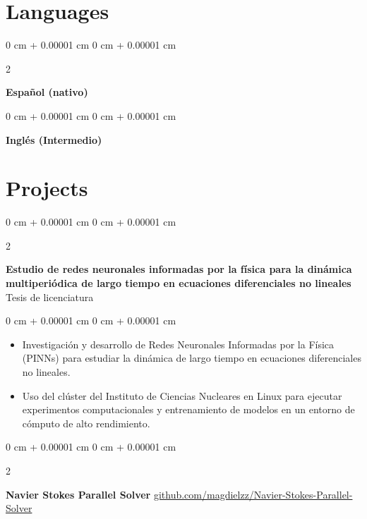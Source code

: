\documentclass[10pt, letterpaper]{article}
\newenvironment{highlights}{
    \begin{itemize}[
        topsep=0.10 cm,
        parsep=0.10 cm,
        partopsep=0pt,
        itemsep=0pt,
        leftmargin=0 cm + 10pt
    ]
}{
    \end{itemize}
} %
\newenvironment{onecolentry}{
    \begin{adjustwidth}{
        0 cm + 0.00001 cm
    }{
        0 cm + 0.00001 cm
    }
}{
    \end{adjustwidth}
} %
\newenvironment{twocolentry}[2][]{
    \onecolentry
    \def\secondColumn{#2}
    \setcolumnwidth{\fill, 4.5 cm}
    \begin{paracol}{2}
}{
    \switchcolumn \raggedleft \secondColumn
    \end{paracol}
    \endonecolentry
} %
\begin{document}
    \section{Languages}
        
        \begin{samepage}
            \begin{twocolentry}{
                
            }
                \textbf{Español (nativo)}
            \end{twocolentry}

            \vspace{0.10 cm}
            \begin{onecolentry}
                \textbf{Inglés (Intermedio)} 
            \end{onecolentry}
        \end{samepage}

    \section{Projects}

        \begin{twocolentry}{
            Tesis de licenciatura
        }
            \textbf{Estudio de redes neuronales informadas por la física para la dinámica multiperiódica de largo tiempo en ecuaciones diferenciales no lineales}\end{twocolentry}

        \vspace{0.10 cm}
        \begin{onecolentry}
            \begin{highlights}
                \item Investigación y desarrollo de Redes Neuronales Informadas por la Física (PINNs) para estudiar la dinámica de largo tiempo en ecuaciones diferenciales no lineales.
                \item Uso del clúster del Instituto de Ciencias Nucleares en Linux para ejecutar experimentos computacionales y entrenamiento de modelos en un entorno de cómputo de alto rendimiento.
            \end{highlights}
        \end{onecolentry}

        \vspace{0.2 cm}
        
        \begin{twocolentry}{
            \href{https://github.com/magdielzz/Navier-Stokes-Parallel-Solver.git}{github.com/magdielzz/Navier-Stokes-Parallel-Solver}
        }
            \textbf{Navier Stokes Parallel Solver}\end{twocolentry}
\end{document}
